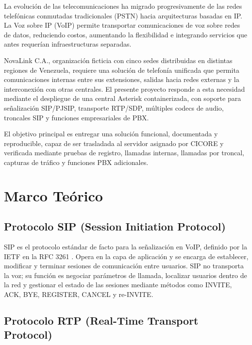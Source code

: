 \documentclass[12pt,a4paper]{article}
\begin{document}
La evolución de las telecomunicaciones ha migrado progresivamente de las redes telefónicas conmutadas tradicionales (PSTN) hacia arquitecturas basadas en IP. La Voz sobre IP (VoIP) permite transportar comunicaciones de voz sobre redes de datos, reduciendo costos, aumentando la flexibilidad e integrando servicios que antes requerían infraestructuras separadas.

NovaLink C.A., organización ficticia con cinco sedes distribuidas en distintas regiones de Venezuela, requiere una solución de telefonía unificada que permita comunicaciones internas entre sus extensiones, salidas hacia redes externas y la interconexión con otras centrales. El presente proyecto responde a esta necesidad mediante el despliegue de una central Asterisk containerizada, con soporte para señalización SIP/PJSIP, transporte RTP/SDP, múltiples codecs de audio, troncales SIP y funciones empresariales de PBX.

El objetivo principal es entregar una solución funcional, documentada y reproducible, capaz de ser trasladada al servidor asignado por CICORE y verificada mediante pruebas de registro, llamadas internas, llamadas por troncal, capturas de tráfico y funciones PBX adicionales.

\section{Marco Teórico}

\subsection{Protocolo SIP (Session Initiation Protocol)}

SIP es el protocolo estándar de facto para la señalización en VoIP, definido por la IETF en la RFC 3261 \cite{rfc3261}. Opera en la capa de aplicación y se encarga de establecer, modificar y terminar sesiones de comunicación entre usuarios. SIP no transporta la voz; su función es negociar parámetros de llamada, localizar usuarios dentro de la red y gestionar el estado de las sesiones mediante métodos como INVITE, ACK, BYE, REGISTER, CANCEL y re-INVITE.

\subsection{Protocolo RTP (Real-Time Transport Protocol)}
\end{document}
